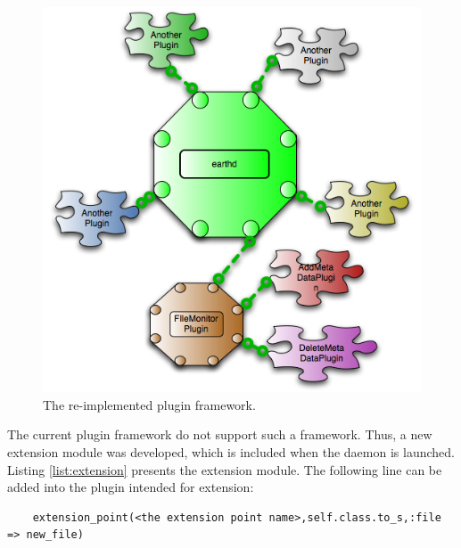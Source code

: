 \documentclass{article}
\begin{document}
\begin{figure}
    \centering
    \includegraphics[scale=0.7]{plugin_framework.png}
    \caption{The re-implemented plugin framework.}
    \label{fig:framework}
\end{figure}

The current plugin framework do not support such a framework. Thus, a new extension module was developed, which is included when the daemon is launched. Listing \ref{list:extension} presents the extension module. The following line can be added into the plugin intended for extension:

\begin{verbatim}
    extension_point(<the extension point name>,self.class.to_s,:file => new_file)
\end{verbatim}
\end{document}
